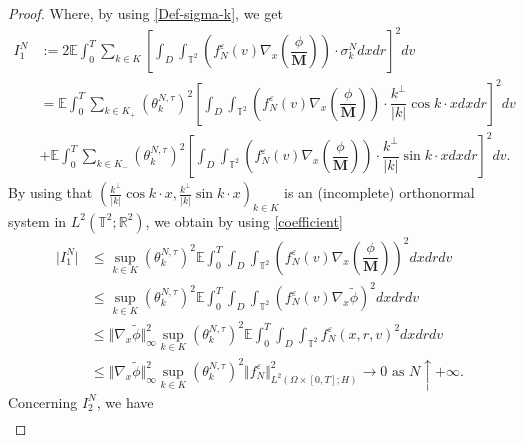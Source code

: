 \documentclass[a4paper,12pt, reqno]{amsart}
\newcommand{\E}{\ensuremath{\mathbb{E}}}
\newcommand{\T}{\mathbb{T}}
\begin{document}
\begin{proof}

		Where, by  using   \eqref{Def-sigma-k},   we  get
		\begin{align*}
			I_1^N&:=2\E\int_0^T\sum_{k\in K}\left[\int_{D}\int_{\mathbb{T}^2}(f_N^\varepsilon(v)\nabla_x(\dfrac{\phi}{\mathbf{M}}))\cdot\sigma_k^N dxdr\right]^2dv\\&=\E\int_0^T\sum_{k\in K_+}(\theta^{N,\tau}_{k})^2\left[\int_{D}\int_{\mathbb{T}^2}(f_N^\varepsilon(v)\nabla_x(\dfrac{\phi}{\mathbf{M}}))\cdot  \dfrac{k^\perp}{\vert   k\vert}\cos{k\cdot  x}dxdr\right]^2dv\\&+\E\int_0^T\sum_{k\in K_-}(\theta^{N,\tau}_{k})^2\left[\int_{D}\int_{\mathbb{T}^2}(f_N^\varepsilon(v)\nabla_x(\dfrac{\phi}{\mathbf{M}}))\cdot  \dfrac{k^\perp}{\vert   k\vert}\sin{k\cdot  x}dxdr\right]^2dv.
		\end{align*}
		By using   that    $(\frac{k^\perp}{\vert   k\vert}\cos{k\cdot  x},\frac{k^\perp}{\vert   k\vert}\sin{k\cdot  x})_{k\in  K}$  is an
		(incomplete) orthonormal system in  $L^2(\T^2;\mathbb{R}^2)$,    we  obtain by  using   \eqref{coefficient}  
      	\begin{align*}
			\vert I_1^N\vert&\leq     \sup_{k\in  K}(\theta^{N,\tau}_{k})^2\E\int_0^T\int_{D}\int_{\mathbb{T}^2}(f_N^\varepsilon(v)\nabla_x(\dfrac{\phi}{\mathbf{M}}))^2dxdrdv\\&\leq\sup_{k\in  K}(\theta^{N,\tau}_{k})^2\E\int_0^T\int_{D}\int_{\mathbb{T}^2}(f_N^\varepsilon(v)\nabla_x\widetilde{\phi})^2dxdrdv\\
			&\leq    \Vert \nabla_x\widetilde{\phi}\Vert_\infty^2\sup_{k\in  K}(\theta^{N,\tau}_{k})^2  \E\int_0^T\int_{D}\int_{\mathbb{T}^2}f_N^\varepsilon(x,r,v)^2dxdrdv\\&\leq   \Vert \nabla_x\widetilde{\phi}\Vert_\infty^2\sup_{k\in  K}(\theta^{N,\tau}_{k})^2\Vert  f_N^\varepsilon\Vert_{L^2(\Omega\times[0,T];H)}^2\to   0   \text{  as  }   N\uparrow    +\infty.
		\end{align*}
		Concerning   $I_2^N$,    we  have
		\begin{align*}

\end{align*}
\end{proof}
\end{document}
